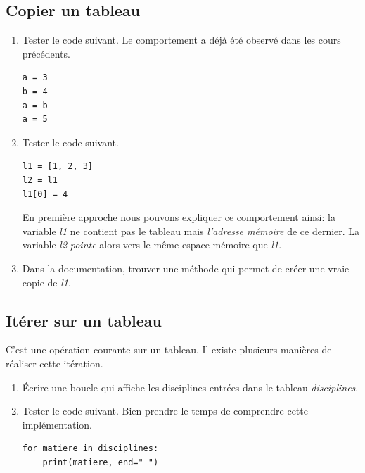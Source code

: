 \documentclass[a4paper,11pt]{article}
\begin{document}
\begin{Form}
\subsection{Copier un tableau}
\begin{activite}
\begin{enumerate}
\item Tester le code suivant. Le comportement a déjà été observé dans les cours précédents.
\begin{lstlisting}
a = 3
b = 4
a = b
a = 5
\end{lstlisting}
\item Tester le code suivant.
\begin{lstlisting}
l1 = [1, 2, 3]
l2 = l1
l1[0] = 4
\end{lstlisting}
En première approche nous pouvons expliquer ce comportement ainsi: la variable \emph{l1} ne contient pas le tableau mais \emph{l'adresse mémoire} de ce dernier. La variable \emph{l2} \emph{pointe} alors vers le même espace mémoire que \emph{l1}.
\item Dans la documentation, trouver une méthode qui permet de créer une vraie copie de \emph{l1}.
\end{enumerate}
\end{activite}
\subsection{Itérer sur un tableau}
C'est une opération courante sur un tableau. Il existe plusieurs manières de réaliser cette itération. 
\begin{activite}
\begin{enumerate}
\item Écrire une boucle qui affiche les disciplines entrées dans le tableau \emph{disciplines}.
\item Tester le code suivant. Bien prendre le temps de comprendre cette implémentation.
\begin{lstlisting}
for matiere in disciplines:
	print(matiere, end=" ")
\end{lstlisting}
\end{enumerate}
\end{activite}

\end{Form}
\end{document}
